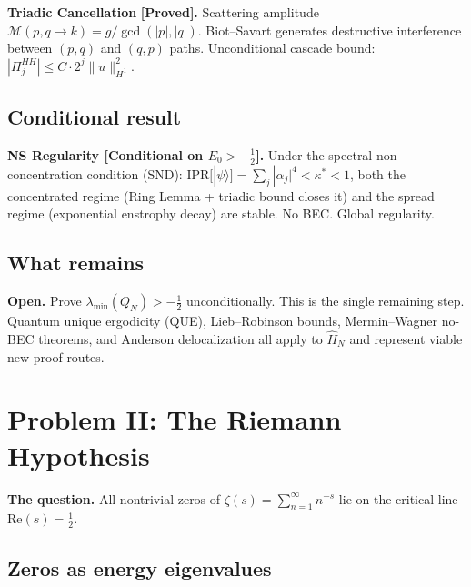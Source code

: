 \documentclass[12pt]{article}
\newcommand{\ket}[1]{|{#1}\rangle}
\newcommand{\half}{\tfrac{1}{2}}
\begin{document}
\begin{tcolorbox}[provedbox]
\textbf{Triadic Cancellation} \cite{Triadic2026} \textbf{[Proved].}
Scattering amplitude $\mathcal{M}(p,q\to k) = g/\gcd(|p|,|q|)$.
Biot--Savart generates destructive interference between $(p,q)$ and $(q,p)$ paths.
Unconditional cascade bound: $|\Pi_j^{HH}| \le C\cdot2^j\|u\|_{H^1}^2$.
\end{tcolorbox}

\subsection{Conditional result}

\begin{tcolorbox}[keybox]
\textbf{NS Regularity [Conditional on $E_0>-\half$].}
Under the spectral non-concentration condition (SND):
$\mathrm{IPR}[\ket{\psi}] = \sum_j|\alpha_j|^4 < \kappa^* < 1$,
both the concentrated regime (Ring Lemma + triadic bound closes it)
and the spread regime (exponential enstrophy decay) are stable.
No BEC. Global regularity.
\end{tcolorbox}

\subsection{What remains}

\begin{tcolorbox}[openbox]
\textbf{Open.} Prove $\lambda_{\min}(Q_N) > -\half$ unconditionally.
This is the single remaining step.
Quantum unique ergodicity (QUE), Lieb--Robinson bounds,
Mermin--Wagner no-BEC theorems, and Anderson delocalization
all apply to $\hat{H}_N$ and represent viable new proof routes.
\end{tcolorbox}

\section{Problem II: The Riemann Hypothesis}
\label{sec:rh}

\textbf{The question.}
All nontrivial zeros of $\zeta(s) = \sum_{n=1}^\infty n^{-s}$ lie on
the critical line $\mathrm{Re}(s) = \half$.

\subsection{Zeros as energy eigenvalues}
\end{document}
